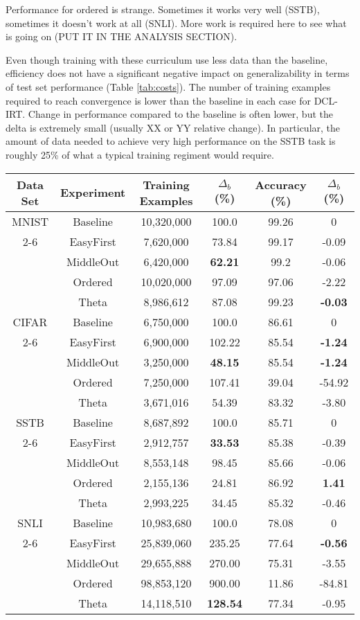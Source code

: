 \documentclass[letterpaper]{article} %
\begin{document}
Performance for ordered is strange.
Sometimes it works very well (SSTB), sometimes it doesn't work at all (SNLI).
More work is required here to see what is going on (PUT IT IN THE ANALYSIS SECTION).

Even though training with these curriculum use less data than the baseline, efficiency does not have a significant negative impact on generalizability in terms of test set performance (Table \ref{tab:costs}).
The number of training examples required to reach convergence is lower than the baseline in each case for DCL-IRT.
Change in performance compared to the baseline is often lower, but the delta is extremely small (usually XX or YY relative change). 
In particular, the amount of data needed to achieve very high performance on the SSTB task is roughly 25\% of what a typical training regiment would require.


\begin{table*}[t]
	\centering 
	\begin{tabular}{cccccc}
		\toprule
		Data Set & Experiment & Training Examples & $\Delta_b$ (\%) & Accuracy (\%) & $\Delta_b$ (\%)\\ 
		\midrule
		MNIST & Baseline & 10,320,000& 100.0&	99.26&	0
		 \\
		 \cmidrule{2-6}
		& EasyFirst & 7,620,000&	73.84&	99.17&	-0.09
		 \\
		& MiddleOut & 6,420,000	&\bf 62.21	&99.2&	-0.06
		 \\
		& Ordered &10,020,000&	97.09&	97.06&	-2.22
		 \\
		& Theta& 8,986,612&	87.08&	99.23&	\bf -0.03
		 \\
		\midrule
		CIFAR & Baseline &  6,750,000& 	100.0&	86.61&	0
		 \\
		 \cmidrule{2-6}
		& EasyFirst & 6,900,000&	102.22&	85.54	&\bf -1.24
		 \\
		& MiddleOut & 3,250,000&	\bf 48.15&	85.54&	\bf -1.24
		 \\
		& Ordered &7,250,000&	107.41&	39.04	&-54.92
		 \\
		& Theta &3,671,016	&54.39&	83.32&	-3.80
		 \\
		\midrule
		SSTB & Baseline &  8,687,892 	&100.0	&85.71&	0
		\\
		\cmidrule{2-6}
		& EasyFirst & 2,912,757	&\bf 33.53&	85.38&	-0.39
		 \\
		& MiddleOut & 8,553,148	&98.45&	85.66&	-0.06
		 \\
		& Ordered & 2,155,136&	24.81&	86.92&	\bf 1.41
		 \\
		& Theta &2,993,225&	34.45&	85.32&	-0.46
		 \\
		\midrule
		SNLI & Baseline &  10,983,680& 	100.0&	78.08&	0
		 \\
		 \cmidrule{2-6}
		& EasyFirst & 25,839,060&	235.25&	77.64& \bf	-0.56
		 \\
		& MiddleOut &29,655,888&	270.00&	75.31&	-3.55
		 \\
		& Ordered & 98,853,120&	900.00&	11.86&	-84.81
		 \\
		& Theta& 14,118,510&	\bf 128.54&	77.34&	-0.95
		 \\
		\bottomrule 
	\end{tabular}
	\label{tab:costs}
\end{table*}
\end{document}
